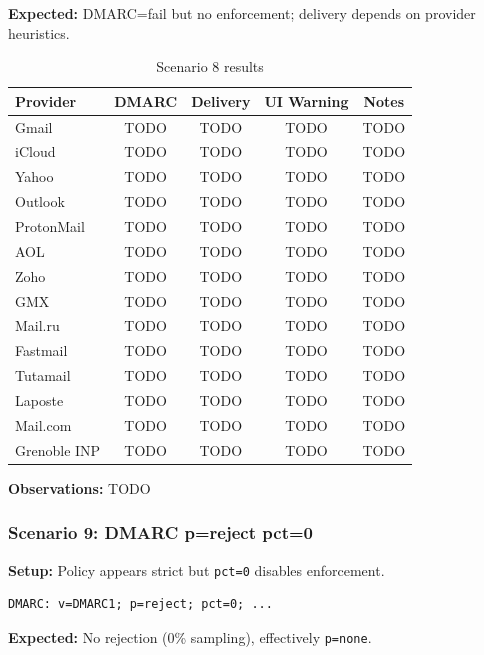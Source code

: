 \documentclass[11pt,a4paper]{article}
\begin{document}
\textbf{Expected:} DMARC=fail but no enforcement; delivery depends on provider heuristics.

\begin{table}[h]
\centering
\small
\begin{tabular}{lcccc}
\toprule
\textbf{Provider} & \textbf{DMARC} & \textbf{Delivery} & \textbf{UI Warning} & \textbf{Notes} \\
\midrule
Gmail & TODO & TODO & TODO & TODO \\
iCloud & TODO & TODO & TODO & TODO \\
Yahoo & TODO & TODO & TODO & TODO \\
Outlook & TODO & TODO & TODO & TODO \\
ProtonMail & TODO & TODO & TODO & TODO \\
AOL & TODO & TODO & TODO & TODO \\
Zoho & TODO & TODO & TODO & TODO \\
GMX & TODO & TODO & TODO & TODO \\
Mail.ru & TODO & TODO & TODO & TODO \\
Fastmail & TODO & TODO & TODO & TODO \\
Tutamail & TODO & TODO & TODO & TODO \\
Laposte & TODO & TODO & TODO & TODO \\
Mail.com & TODO & TODO & TODO & TODO \\
Grenoble INP & TODO & TODO & TODO & TODO \\
\bottomrule
\end{tabular}
\caption{Scenario 8 results}
\end{table}

\textbf{Observations:} TODO


\subsubsection{Scenario 9: DMARC p=reject pct=0}

\textbf{Setup:} Policy appears strict but \texttt{pct=0} disables enforcement.

\begin{lstlisting}
DMARC: v=DMARC1; p=reject; pct=0; ...
\end{lstlisting}

\textbf{Expected:} No rejection (0\% sampling), effectively \texttt{p=none}.
\end{document}

